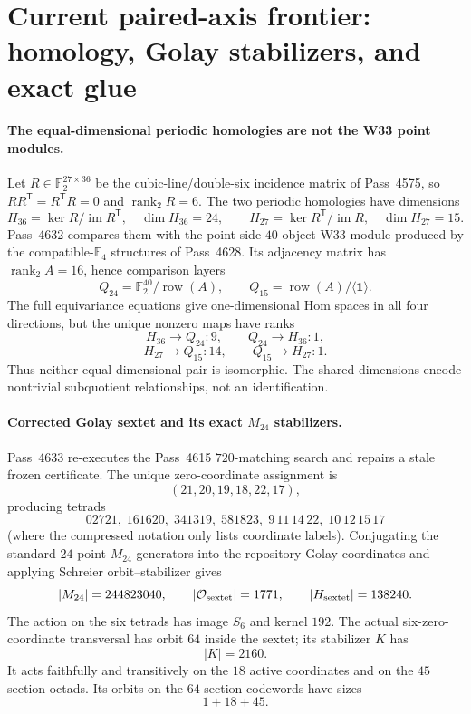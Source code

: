\section*{Current paired-axis frontier: homology, Golay stabilizers, and exact glue}

\paragraph{The equal-dimensional periodic homologies are not the W33 point modules.}
Let $R\in\mathbb F_2^{27\times36}$ be the cubic-line/double-six incidence matrix of Pass~4575, so $RR^{\mathsf T}=R^{\mathsf T}R=0$ and $\operatorname{rank}_2R=6$.  The two periodic homologies have dimensions
\[
 H_{36}=\ker R/\operatorname{im}R^{\mathsf T},\quad \dim H_{36}=24,
 \qquad
 H_{27}=\ker R^{\mathsf T}/\operatorname{im}R,\quad \dim H_{27}=15.
\]
Pass~4632 compares them with the point-side $40$-object W33 module produced by the compatible-$\mathbb F_4$ structures of Pass~4628.  Its adjacency matrix has $\operatorname{rank}_2A=16$, hence comparison layers
\[
 Q_{24}=\mathbb F_2^{40}/\operatorname{row}(A),
 \qquad
 Q_{15}=\operatorname{row}(A)/\langle\mathbf1\rangle.
\]
The full equivariance equations give one-dimensional Hom spaces in all four directions, but the unique nonzero maps have ranks
\[
 H_{36}\to Q_{24}:9,\qquad Q_{24}\to H_{36}:1,
\]
\[
 H_{27}\to Q_{15}:14,\qquad Q_{15}\to H_{27}:1.
\]
Thus neither equal-dimensional pair is isomorphic.  The shared dimensions encode nontrivial subquotient relationships, not an identification.

\paragraph{Corrected Golay sextet and its exact $M_{24}$ stabilizers.}
Pass~4633 re-executes the Pass~4615 $720$-matching search and repairs a stale frozen certificate.  The unique zero-coordinate assignment is
\[
 (21,20,19,18,22,17),
\]
producing tetrads
\[
 02721,\;161620,\;341319,\;581823,\;9\,11\,14\,22,\;10\,12\,15\,17
\]
(where the compressed notation only lists coordinate labels).  Conjugating the standard $24$-point $M_{24}$ generators into the repository Golay coordinates and applying Schreier orbit--stabilizer gives
\[
 |M_{24}|=244823040,\qquad |\mathcal O_{\rm sextet}|=1771,\qquad |H_{\rm sextet}|=138240.
\]
The action on the six tetrads has image $S_6$ and kernel $192$.  The actual six-zero-coordinate transversal has orbit $64$ inside the sextet; its stabilizer $K$ has
\[
 |K|=2160.
\]
It acts faithfully and transitively on the $18$ active coordinates and on the $45$ section octads.  Its orbits on the $64$ section codewords have sizes
\[
 1+18+45.
\]

